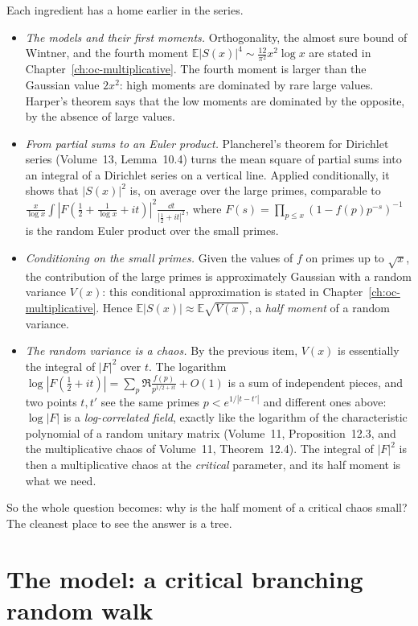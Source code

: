 Each ingredient has a home earlier in the series.
\begin{itemize}
\item \emph{The models and their first moments.} Orthogonality, the almost sure bound of Wintner, and the fourth moment $\mathbb E|S(x)|^4\sim\frac{12}{\pi^2}x^2\log x$ are stated in Chapter~\ref{ch:oc-multiplicative}. The fourth moment is larger than the Gaussian value $2x^2$: high moments are dominated by rare large values. Harper's theorem says that the low moments are dominated by the opposite, by the absence of large values.
\item \emph{From partial sums to an Euler product.} Plancherel's theorem for Dirichlet series (Volume~13, Lemma~10.4) turns the mean square of partial sums into an integral of a Dirichlet series on a vertical line. Applied conditionally, it shows that $|S(x)|^2$ is, on average over the large primes, comparable to $\frac x{\log x}\int|F(\frac12+\frac1{\log x}+it)|^2\frac{\dd t}{|\frac12+it|^2}$, where $F(s)=\prod_{p\le x}(1-f(p)p^{-s})^{-1}$ is the random Euler product over the small primes.
\item \emph{Conditioning on the small primes.} Given the values of $f$ on primes up to $\sqrt x$, the contribution of the large primes is approximately Gaussian with a random variance $V(x)$: this conditional approximation is stated in Chapter~\ref{ch:oc-multiplicative}. Hence $\mathbb E|S(x)|\approx\mathbb E\sqrt{V(x)}$, a \emph{half moment} of a random variance.
\item \emph{The random variance is a chaos.} By the previous item, $V(x)$ is essentially the integral of $|F|^2$ over $t$. The logarithm $\log|F(\frac12+it)|=\sum_p\Re\frac{f(p)}{p^{1/2+it}}+O(1)$ is a sum of independent pieces, and two points $t,t'$ see the same primes $p<e^{1/|t-t'|}$ and different ones above: $\log|F|$ is a \emph{log-correlated field}, exactly like the logarithm of the characteristic polynomial of a random unitary matrix (Volume~11, Proposition~12.3, and the multiplicative chaos of Volume~11, Theorem~12.4). The integral of $|F|^2$ is then a multiplicative chaos at the \emph{critical} parameter, and its half moment is what we need.
\end{itemize}

So the whole question becomes: why is the half moment of a critical chaos small? The cleanest place to see the answer is a tree.

\section{The model: a critical branching random walk}

